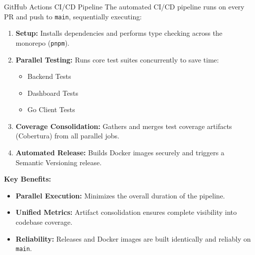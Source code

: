 \documentclass[aspectratio=169]{beamer}
\begin{document}
\begin{frame}{GitHub Actions CI/CD Pipeline}
    \vspace{0.3cm}
    The automated CI/CD pipeline runs on every PR and push to \texttt{main}, sequentially executing:
    \vspace{0.2cm}
    \begin{enumerate}
        \item \textbf{Setup:} Installs dependencies and performs type checking across the monorepo (\texttt{pnpm}).
        \item \textbf{Parallel Testing:} Runs core test suites concurrently to save time:
        \begin{itemize}
            \item Backend Tests
            \item Dashboard Tests
            \item Go Client Tests
        \end{itemize}
        \item \textbf{Coverage Consolidation:} Gathers and merges test coverage artifacts (Cobertura) from all parallel jobs.
        \item \textbf{Automated Release:} Builds Docker images securely and triggers a Semantic Versioning release.
    \end{enumerate}
    
    \vspace{0.4cm}
    \textbf{Key Benefits:}
    \begin{itemize}
        \item \textbf{Parallel Execution:} Minimizes the overall duration of the pipeline.
        \item \textbf{Unified Metrics:} Artifact consolidation ensures complete visibility into codebase coverage.
        \item \textbf{Reliability:} Releases and Docker images are built identically and reliably on \texttt{main}.
    \end{itemize}
\end{frame}
\end{document}
